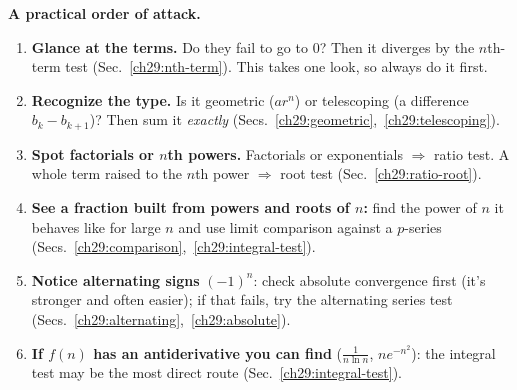 \begin{focusbox}
\textbf{A practical order of attack.}
\begin{enumerate}
\item \textbf{Glance at the terms.} Do they fail to go to $0$? Then it diverges by the $n$th-term test (Sec.~\ref{ch29:nth-term}). This takes one look, so always do it first.
\item \textbf{Recognize the type.} Is it geometric ($a r^n$) or telescoping (a difference $b_k - b_{k+1}$)? Then sum it \emph{exactly} (Secs.~\ref{ch29:geometric},~\ref{ch29:telescoping}).
\item \textbf{Spot factorials or $n$th powers.} Factorials or exponentials $\Rightarrow$ ratio test. A whole term raised to the $n$th power $\Rightarrow$ root test (Sec.~\ref{ch29:ratio-root}).
\item \textbf{See a fraction built from powers and roots of $n$:} find the power of $n$ it behaves like for large $n$ and use limit comparison against a $p$-series (Secs.~\ref{ch29:comparison},~\ref{ch29:integral-test}).
\item \textbf{Notice alternating signs} $(-1)^n$: check absolute convergence first (it's stronger and often easier); if that fails, try the alternating series test (Secs.~\ref{ch29:alternating},~\ref{ch29:absolute}).
\item \textbf{If $f(n)$ has an antiderivative you can find} ($\tfrac1{n\ln n}$, $n e^{-n^2}$): the integral test may be the most direct route (Sec.~\ref{ch29:integral-test}).
\end{enumerate}
\end{focusbox}

